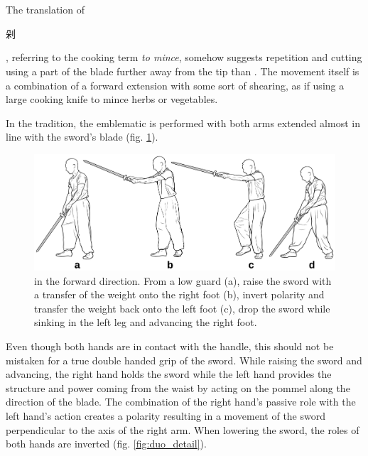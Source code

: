 \section{\Duo}
The translation of \Duo{} \begin{CJK*}{UTF8}{bsmi}剁\end{CJK*}, referring to the cooking term \textit{to mince}, somehow suggests repetition and cutting using a part of the blade further away from the tip than \Pi{}. The movement itself is a combination of a forward extension with some sort of shearing, as if using a large cooking knife to mince herbs or vegetables.

In the \Yangjia{} \Michuan{} tradition, the emblematic \Duo{} is performed with both arms extended almost in line with the sword's blade (fig. \ref{fig:duo_full}). 


\begin{figure}[ht]
	\centering
	
	\includegraphics[width=1.00\textwidth]{../../Images/JibenJianfa/Duo/Duo.pdf}
	\caption[Advancing \Duo{}]{\Duo{} in the forward direction. From a low guard (a), raise the sword with a transfer of the weight onto the right foot (b), invert polarity and transfer the weight back onto the left foot (c), drop the sword while sinking in the left leg and advancing the right foot.}
	\label{fig:duo_full}
\end{figure} 

Even though both hands are in contact with the handle,  this should not be mistaken for a true double handed grip of the sword. While raising the sword and advancing, the right hand holds the sword while the left hand provides the structure and power coming from the waist by acting on the pommel along the direction of the blade. The combination of the right hand's passive role with the left hand's action creates a polarity resulting in a movement of the sword perpendicular to the axis of the right arm. When lowering the sword, the roles of both hands are inverted (fig. \ref{fig:duo_detail}). 

